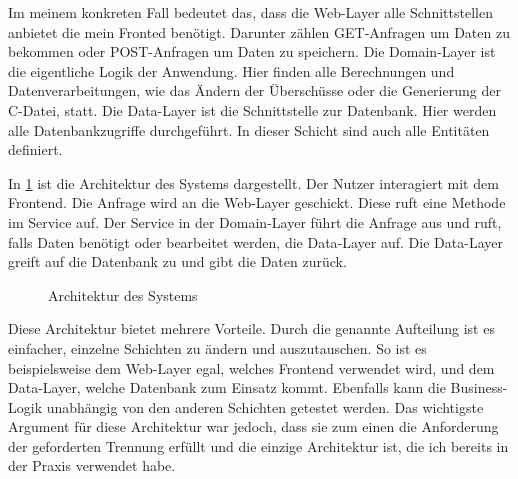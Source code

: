 Im meinem konkreten Fall bedeutet das, dass die Web-Layer alle Schnittstellen anbietet die mein Fronted benötigt. Darunter zählen GET-Anfragen um Daten zu bekommen oder
POST-Anfragen um Daten zu speichern.
Die Domain-Layer ist die eigentliche Logik der Anwendung. Hier finden alle Berechnungen und Datenverarbeitungen, wie das Ändern der Überschüsse oder die Generierung der C-Datei, statt.
Die Data-Layer ist die Schnittstelle zur Datenbank. Hier werden alle Datenbankzugriffe durchgeführt. In dieser Schicht sind auch alle Entitäten definiert.

In \ref{fig:architecture} ist die Architektur des Systems dargestellt. Der Nutzer interagiert mit dem Frontend. Die Anfrage wird an die Web-Layer geschickt. 
Diese ruft eine Methode im Service auf. Der Service in der Domain-Layer führt die Anfrage aus und ruft, falls Daten benötigt oder bearbeitet werden, die Data-Layer auf.
Die Data-Layer greift auf die Datenbank zu und gibt die Daten zurück.

\begin{figure}[h]
  \centering
  \resizebox{\textwidth}{!}{}
  \caption{Architektur des Systems}
  \label{fig:architecture}
\end{figure}

Diese Architektur bietet mehrere Vorteile. Durch die genannte Aufteilung ist es einfacher, einzelne Schichten zu ändern und auszutauschen. 
So ist es beispielsweise dem Web-Layer egal, welches Frontend verwendet wird, und dem Data-Layer, welche Datenbank zum Einsatz kommt.
Ebenfalls kann die Business-Logik unabhängig von den anderen Schichten getestet werden.
Das wichtigste Argument für diese Architektur war jedoch, dass sie zum einen die Anforderung der geforderten Trennung erfüllt und die einzige Architektur ist, die ich bereits in der Praxis verwendet habe.